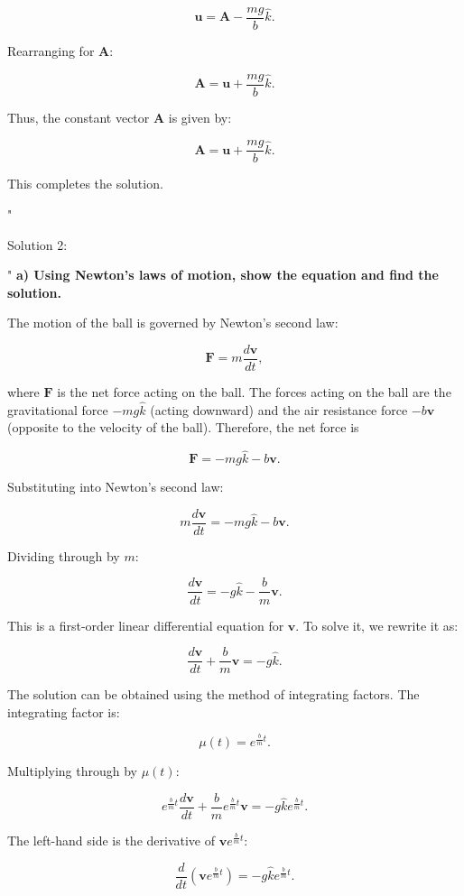 \[
\mathbf{u} = \mathbf{A} - \frac{mg}{b} \hat{k}.
\]

Rearranging for $\mathbf{A}$:

\[
\mathbf{A} = \mathbf{u} + \frac{mg}{b} \hat{k}.
\]

Thus, the constant vector $\mathbf{A}$ is given by:

\[
\mathbf{A} = \mathbf{u} + \frac{mg}{b} \hat{k}.
\]

This completes the solution.

"

Solution 2: 

"
\textbf{a) Using Newton's laws of motion, show the equation and find the solution.}

The motion of the ball is governed by Newton's second law:

\[
\mathbf{F} = m \frac{d \mathbf{v}}{dt},
\]

where $\mathbf{F}$ is the net force acting on the ball. The forces acting on the ball are the gravitational force $-mg\hat{k}$ (acting downward) and the air resistance force $-b \mathbf{v}$ (opposite to the velocity of the ball). Therefore, the net force is

\[
\mathbf{F} = -mg\hat{k} - b\mathbf{v}.
\]

Substituting into Newton's second law:

\[
m \frac{d \mathbf{v}}{dt} = -mg\hat{k} - b\mathbf{v}.
\]

Dividing through by $m$:

\[
\frac{d \mathbf{v}}{dt} = -g\hat{k} - \frac{b}{m}\mathbf{v}.
\]

This is a first-order linear differential equation for $\mathbf{v}$. To solve it, we rewrite it as:

\[
\frac{d \mathbf{v}}{dt} + \frac{b}{m}\mathbf{v} = -g\hat{k}.
\]

The solution can be obtained using the method of integrating factors. The integrating factor is:

\[
\mu(t) = e^{\frac{b}{m}t}.
\]

Multiplying through by $\mu(t)$:

\[
e^{\frac{b}{m}t} \frac{d \mathbf{v}}{dt} + \frac{b}{m} e^{\frac{b}{m}t} \mathbf{v} = -g\hat{k} e^{\frac{b}{m}t}.
\]

The left-hand side is the derivative of $\mathbf{v} e^{\frac{b}{m}t}$:

\[
\frac{d}{dt} \left( \mathbf{v} e^{\frac{b}{m}t} \right) = -g\hat{k} e^{\frac{b}{m}t}.
\]

